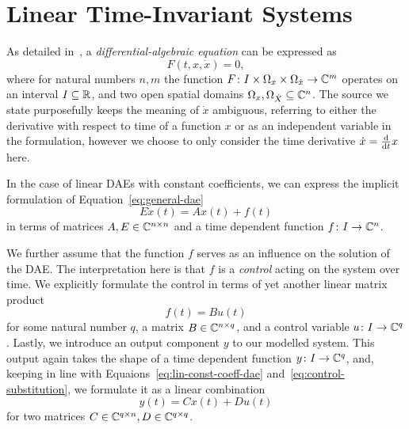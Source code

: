 \section{Linear Time-Invariant Systems}\label{sec:ltis}

As detailed in~\cite{Kunkel2006}, a \emph{differential-algebraic equation} can be expressed as
\begin{equation}\label{eq:general-dae}
    F(t, x, \dot{x}) = 0,
\end{equation}
where for natural numbers $n, m$ the function $F \colon I \times \Omega_x \times \Omega_{\dot{x}} \to \mathbb{C}^m$ operates on an interval $I \subseteq \mathbb{R}$, and two open spatial domains $\Omega_x, \Omega_{\dot{X}} \subseteq \mathbb{C}^n$.
The source we state purposefully keeps the meaning of $\dot{x}$ ambiguous, referring to either the derivative with respect to time of a function $x$ or as an independent variable in the formulation, however we choose to only consider the time derivative $\dot{x} = \frac{\mathop{}\!\mathrm{d}}{\mathop{}\!\mathrm{d} t} x$ here.

In the case of linear DAEs with constant coefficients, we can express the implicit formulation of Equation~\eqref{eq:general-dae}
\begin{equation}\label{eq:lin-const-coeff-dae}
    E \dot{x}(t) = A x(t) + f(t)
\end{equation}
in terms of matrices $A, E \in \mathbb{C}^{n \times n}$ and a time dependent function $f \colon I \to \mathbb{C}^n$.

We further assume that the function $f$ serves as an influence on the solution of the DAE.
The interpretation here is that $f$ is a \emph{control} acting on the system over time.
We explicitly formulate the control in terms of yet another linear matrix product
\begin{equation}\label{eq:control-substitution}
    f(t) = B u(t)
\end{equation}
for some natural number $q$, a matrix $B \in \mathbb{C}^{n \times q}$, and a control variable $u \colon I \to \mathbb{C}^q$.
Lastly, we introduce an output component $y$ to our modelled system.
This output again takes the shape of a time dependent function $y \colon I \to \mathbb{C}^q$, and, keeping in line with Equaions~\eqref{eq:lin-const-coeff-dae} and~\eqref{eq:control-substitution}, we formulate it as a linear combination
\begin{equation}\label{eq:output-definition}
    y(t) = C x(t) + D u(t)
\end{equation}
for two matrices $C \in \mathbb{C}^{q \times n}, D \in \mathbb{C}^{q \times q}$.

